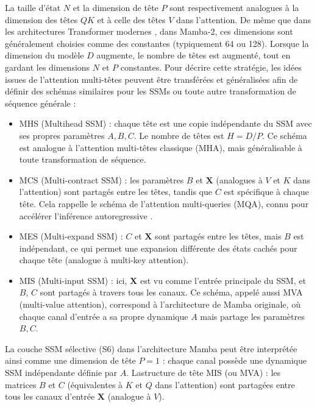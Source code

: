 La taille d'état $N$ et la dimension de tête $P$ sont respectivement analogues à la dimension des têtes $QK$ et à celle des têtes $V$ dans l'attention. De même que dans les architectures Transformer modernes \citep{chowdhery2023palm, touvron2023llama}, dans Mamba-2, ces dimensions sont généralement choisies comme des constantes (typiquement 64 ou 128). Lorsque la dimension du modèle $D$ augmente, le nombre de têtes est augmenté, tout en gardant les dimensions $N$ et $P$ constantes. Pour décrire cette stratégie, les idées issues de l'attention multi-têtes peuvent être transférées et généralisées afin de définir des schémas similaires pour les SSMs ou toute autre transformation de séquence générale :
\begin{itemize}
    \item MHS (Multihead SSM) : chaque tête est une copie indépendante du SSM avec ses propres paramètres $A, B, C$. Le nombre de têtes est $H = D / P$. Ce schéma est analogue à l'attention multi-têtes classique (MHA), mais généralisable à toute transformation de séquence.
    \item MCS (Multi-contract SSM) : les paramètres $B$ et $\mathbf{X}$ (analogues à $V$ et $K$ dans l'attention) sont partagés entre les têtes, tandis que $C$ est spécifique à chaque tête. Cela rappelle le schéma de l'attention multi-queries (MQA), connu pour accélérer l'inférence autoregressive \citep{shazeer2019multiquery}.
    \item MES (Multi-expand SSM) : $C$ et $\mathbf{X}$ sont partagés entre les têtes, mais $B$ est indépendant, ce qui permet une expansion différente des états cachés pour chaque tête (analogue à multi-key attention).
    \item MIS (Multi-input SSM) : ici, $\mathbf{X}$ est vu comme l’entrée principale du SSM, et $B$, $C$ sont partagés à travers tous les canaux. Ce schéma, appelé aussi MVA (multi-value attention), correspond à l’architecture de Mamba originale, où chaque canal d’entrée a sa propre dynamique $A$ mais partage les paramètres $B, C$.
\end{itemize}

\newpage

\begin{proposition} La couche SSM sélective (S6) dans l’architecture Mamba \citep{gu2023mamba} peut être interprétée ainsi comme une dimension de tête $P = 1$ : chaque canal possède une dynamique SSM indépendante définie par $A$. Lastructure de tête MIS (ou MVA) : les matrices $B$ et $C$ (équivalentes à $K$ et $Q$ dans l’attention) sont partagées entre tous les canaux d’entrée $\mathbf{X}$ (analogue à $V$).
\end{proposition}

